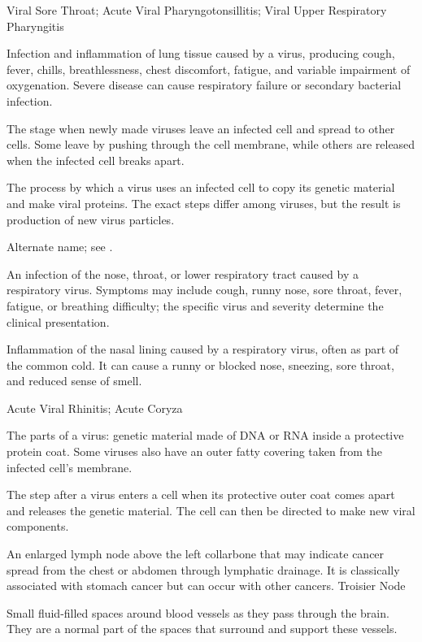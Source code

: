 \synonyms
Viral Sore Throat; Acute Viral Pharyngotonsillitis; Viral Upper Respiratory Pharyngitis

 Infection and inflammation of lung tissue caused by a virus, producing cough, fever, chills, breathlessness, chest discomfort, fatigue, and variable impairment of oxygenation. Severe disease can cause respiratory failure or secondary bacterial infection.

 The stage when newly made viruses leave an infected cell and spread to other cells. Some leave by pushing through the cell membrane, while others are released when the infected cell breaks apart.

 The process by which a virus uses an infected cell to copy its genetic material and make viral proteins. The exact steps differ among viruses, but the result is production of new virus particles.

 Alternate name; see .

 An infection of the nose, throat, or lower
respiratory tract caused by a respiratory virus. Symptoms may include cough, runny nose,
sore throat, fever, fatigue, or breathing difficulty; the specific virus and severity
determine the clinical presentation.

 Inflammation of the nasal lining caused by a respiratory virus, often as part of the common cold. It can cause a runny or blocked nose, sneezing, sore throat, and reduced sense of smell.

\synonyms
Acute Viral Rhinitis; Acute Coryza

 The parts of a virus: genetic material made of DNA or RNA inside a protective protein coat. Some viruses also have an outer fatty covering taken from the infected cell’s membrane.

 The step after a virus enters a cell when its protective outer coat comes apart and releases the genetic material. The cell can then be directed to make new viral components.

 An enlarged lymph node above the left collarbone that may indicate cancer spread from the chest or abdomen through lymphatic drainage. It is classically associated with stomach cancer but can occur with other cancers.
\synonyms
Troisier Node

 Small fluid-filled spaces around blood vessels as they pass through the brain. They are a normal part of the spaces that surround and support these vessels.

